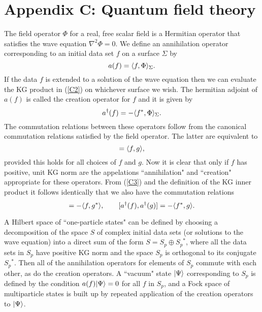 \section*{Appendix C: Quantum field theory}

The field operator $\Phi$ for a real, free scalar field
is a Hermitian operator that satisfies
the wave equation $\nabla^2\Phi=0$. We define an
annihilation operator corresponding to an initial data set
$f$ on a surface $\Sigma$ by
\begin{equation}
a(f)=\langle f,\Phi\rangle_\Sigma.
\label{C2}
\end{equation}
If the data $f$ is extended to a solution of the wave
equation then we can evaluate the KG product in (\ref{C2}) on
whichever surface we wish. The hermitian adjoint of $a(f)$
is called the creation operator for $f$ and it is given by
\begin{equation}
a^{\dagger}(f)=-\langle f^*,\Phi\rangle_\Sigma.
\end{equation}
The commutation relations between these operators follow
from the canonical commutation relations satisfied by the
field operator. The latter are equivalent to
\begin{equation}
 [a(f),a^{\dagger}(g)]=\la f, g\ra,
\label{C3}
\end{equation}
provided this holds for all choices of $f$ and $g$.
Now it is clear that only if $f$ has positive, unit KG norm
are the appelations ``annihilation" and ``creation"
appropriate for these operators.
{}From (\ref{C3}) and the definition of the KG inner product
it follows identically that we also have the commutation
relations
\begin{equation}
[a(f),a(g)]=-\la f, g^*\ra,\qquad
[a^{\dagger}(f),a^{\dagger}(g)]=-\la f^*, g\ra.
\end{equation}

A Hilbert space of ``one-particle states" can be defined by
choosing a decomposition of the space $S$ of complex
initial data sets (or solutions to the wave equation) into a
direct sum of the form $S=S_p\oplus S_p{}^*$, where all the
data sets in $S_p$ have positive KG norm and the space $S_p$
is orthogonal to its conjugate $S_p{}^*$. Then all of the
annihilation operators for elements of $S_p$ commute with
each other, as do the creation operators. A ``vacuum" state
$|\Psi\rangle$ corresponding to $S_p$ is defined by the condition
$a(f)|\Psi\rangle=0$ for all $f$ in $S_p$, and a Fock space of
multiparticle states is built up by repeated application
of the creation operators to $|\Psi\rangle$.


